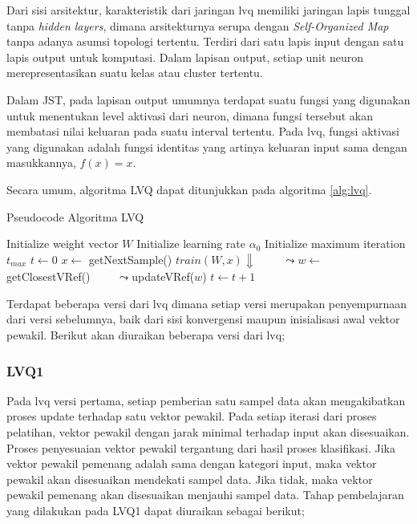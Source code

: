 Dari sisi arsitektur, karakteristik dari jaringan \gls{lvq} memiliki jaringan
lapis tunggal tanpa \textit{hidden layers}, dimana arsitekturnya serupa dengan
\textit{Self-Organized Map} tanpa adanya asumsi topologi tertentu. Terdiri dari
satu lapis input dengan satu lapis output untuk komputasi. Dalam lapisan output,
setiap unit neuron merepresentasikan suatu kelas atau cluster tertentu.

Dalam JST, pada lapisan output umumnya terdapat suatu fungsi yang digunakan
untuk menentukan level aktivasi dari neuron, dimana fungsi tersebut akan
membatasi nilai keluaran pada suatu interval tertentu. Pada \gls{lvq}, fungsi
aktivasi yang digunakan adalah fungsi identitas yang artinya keluaran input sama
dengan masukkannya, $f(x) = x$.

\noindent
Secara umum, algoritma LVQ dapat ditunjukkan pada algoritma \ref{alg:lvq}.

\begin{algorithm}  
\scriptsize 
\caption{Pseudocode Algoritma LVQ}          
\label{alg:lvq}                           
\begin{algorithmic}                    %
	\STATE Initialize weight vector $W$
	\STATE Initialize learning rate $\alpha_0$
	\STATE Initialize maximum iteration $t_{max}$
	\STATE $t \leftarrow 0$
		\STATE $x \leftarrow $ getNextSample()
		\STATE $train(W, x) \Downarrow$
		\STATE $\qquad \leadsto w \leftarrow $ getClosestVRef()
		\STATE $\qquad \leadsto $updateVRef($w$)
		\STATE $t \leftarrow t + 1$
	\ENDWHILE
\end{algorithmic}
\end{algorithm}
 
Terdapat beberapa versi dari \gls{lvq} dimana setiap versi merupakan
penyempurnaan dari versi sebelumnya, baik dari sisi konvergensi 
maupun inisialisasi awal vektor pewakil. Berikut akan diuraikan beberapa versi
dari \gls{lvq};

\subsubsection*{LVQ1}
Pada \gls{lvq} versi pertama, setiap pemberian satu sampel data akan
mengakibatkan proses update terhadap satu vektor pewakil. Pada setiap iterasi
dari proses pelatihan, vektor pewakil dengan jarak minimal terhadap input akan
disesuaikan. Proses penyesuaian vektor pewakil tergantung dari hasil proses
klasifikasi. Jika vektor pewakil pemenang adalah sama dengan kategori input,
maka vektor pewakil akan disesuaikan mendekati sampel data. Jika tidak, maka
vektor pewakil pemenang akan disesuaikan menjauhi sampel data. Tahap
pembelajaran yang dilakukan pada LVQ1 dapat diuraikan sebagai berikut;

